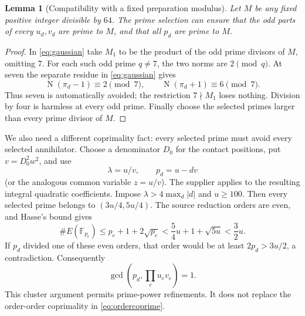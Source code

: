 \documentclass[11pt]{article}
\newtheorem{lemma}[theorem]{Lemma}
\newcommand{\Nm}{\operatorname{N}}
\begin{document}
\begin{lemma}[Compatibility with a fixed preparation modulus]
\label{lem:avoidance}
Let \(M\) be any fixed positive integer divisible by \(64\).
The prime selection can ensure that the odd parts of every
\(u_d,v_d\) are prime to \(M\), and that all \(p_d\) are prime
to \(M\).
\end{lemma}
\begin{proof}
In \eqref{eq:gaussian} take \(M_1\) to be the product of the
odd prime divisors of \(M\), omitting \(7\).
For each such odd prime \(q\ne7\), the two norms are \(2\pmod q\).
At seven the separate residue in \eqref{eq:gaussian} gives
\[
     \Nm(\pi_d-1)\equiv2\pmod7,\qquad
     \Nm(\pi_d+1)\equiv6\pmod7.
\]
Thus seven is automatically avoided; the restriction
\(7\nmid M_1\) loses nothing. Division by four is harmless at
every odd prime. Finally choose the selected primes larger
than every prime divisor of \(M\).
\end{proof}

We also need a different coprimality fact: every selected prime
must avoid every selected annihilator. Choose a denominator
\(D_0\) for the contact positions, put \(v=D_0^2w^2\), and use
\[
                 \lambda=u/v,\qquad p_d=u-dv
\]
(or the analogous common variable \(z=u/v\)).
The supplier applies to the resulting integral quadratic coefficients.
Impose \(\lambda>4\max_d|d|\) and \(u\ge100\).
Then every selected prime belongs to \((3u/4,5u/4)\).
The source reduction orders are even, and Hasse's bound gives
\[
 \#E(\mathbb F_{p_e})
 \le p_e+1+2\sqrt{p_e}
 <\frac54u+1+\sqrt{5u}<\frac32u.
\]
If \(p_d\) divided one of these even orders, that order would
be at least \(2p_d>3u/2\), a contradiction. Consequently
\begin{equation}\label{eq:primeorder}
                  \gcd(p_d,\prod_eu_ev_e)=1 .
\end{equation}
This cluster argument permits prime-power refinements. It does
not replace the order-order coprimality in
\eqref{eq:ordercoprime}.
\end{document}
